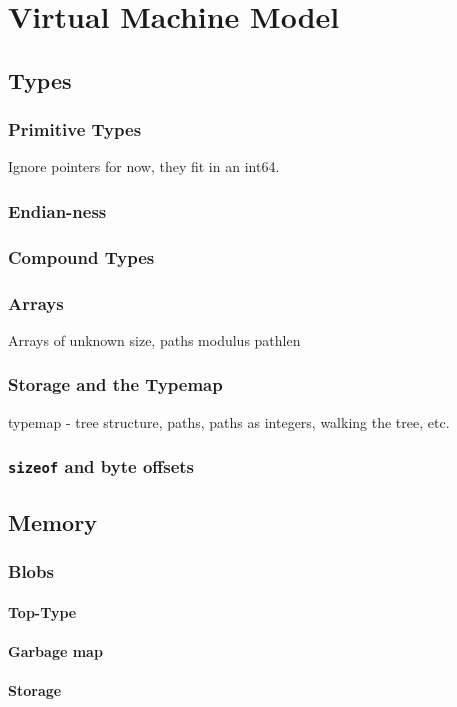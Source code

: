 \chapter{Virtual Machine Model}
\section{Types}
\subsection{Primitive Types}
Ignore pointers for now, they fit in an int64.
\subsection{Endian-ness}
\subsection{Compound Types}
\subsection{Arrays}
Arrays of unknown size, paths modulus pathlen
\subsection{Storage and the Typemap}
typemap - tree structure, paths, paths as integers, walking the tree, etc.
\subsection{{\tt sizeof} and byte offsets}

\section{Memory}
\subsection{Blobs}
\subsubsection{Top-Type}
\subsubsection{Garbage map}
\subsubsection{Storage}
